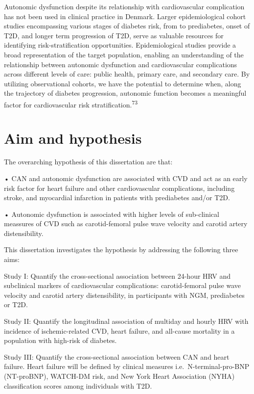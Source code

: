 \documentclass[
  letterpaper,
  headsepline=true,
  open=any]{scrbook}
\begin{document}
Autonomic dysfunction despite its relationship with cardiovascular
complication has not been used in clinical practice in Denmark. Larger
epidemiological cohort studies encompassing various stages of diabetes
risk, from to prediabetes, onset of T2D, and longer term progression of
T2D, serve as valuable resources for identifying risk-stratification
opportunities. Epidemiological studies provide a broad representation of
the target population, enabling an understanding of the relationship
between autonomic dysfunction and cardiovascular complications across
different levels of care: public health, primary care, and secondary
care. By utilizing observational cohorts, we have the potential to
determine when, along the trajectory of diabetes progression, autonomic
function becomes a meaningful factor for cardiovascular risk
stratification.\textsuperscript{73}


\hypertarget{aim-and-hypothesis}{%
\chapter{Aim and hypothesis}\label{aim-and-hypothesis}}

\newpage

The overarching hypothesis of this dissertation are that:

• CAN and autonomic dysfunction are associated with CVD and act as an
early risk factor for heart failure and other cardiovascular
complications, including stroke, and myocardial infarction in patients
with prediabetes and/or T2D.

• Autonomic dysfunction is associated with higher levels of sub-clinical
meassures of CVD such as carotid-femoral pulse wave velocity and carotid
artery distensibility.

This dissertation investigates the hypothesis by addressing the
following three aims:

Study I: Quantify the cross-sectional association between 24-hour HRV
and subclinical markers of cardiovascular complications: carotid-femoral
pulse wave velocity and carotid artery distensibility, in participants
with NGM, prediabetes or T2D.

Study II: Quantify the longitudinal association of multiday and hourly
HRV with incidence of ischemic-related CVD, heart failure, and all-cause
mortality in a population with high-risk of diabetes.

Study III: Quantify the cross-sectional association between CAN and
heart failure. Heart failure will be defined by clinical measures
i.e.~N-terminal-pro-BNP (NT-proBNP), WATCH-DM risk, and New York Heart
Association (NYHA) classification scores among individuals with T2D.
\end{document}
